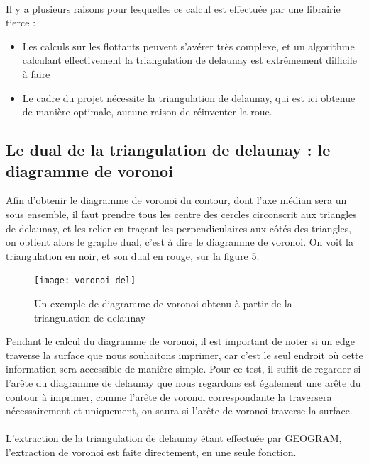 \documentclass[11pt]{article}
\begin{document}
\paragraph*{}
Il y a plusieurs raisons pour lesquelles ce calcul est effectuée par une librairie tierce :
\begin{itemize}
\item Les calculs sur les flottants peuvent s'avérer très complexe, et un algorithme calculant effectivement la triangulation de delaunay est extrêmement difficile à faire
\item Le cadre du projet nécessite la triangulation de delaunay, qui est ici obtenue de manière optimale, aucune raison de réinventer la roue.
\end{itemize}



\subsection{Le dual de la triangulation de delaunay : le diagramme de voronoi}

Afin d'obtenir le diagramme de voronoi du contour, dont l'axe médian sera un sous ensemble, il faut prendre tous les centre des cercles circonscrit aux triangles de delaunay, et les relier en traçant les perpendiculaires aux côtés des triangles, on obtient alors le graphe dual, c'est à dire le diagramme de voronoi. On voit la triangulation en noir, et son dual en rouge, sur la figure 5.

 \begin{figure}[h]
\centering
\texttt{[image: voronoi-del]}
\caption{Un exemple de diagramme de voronoi obtenu à partir de la triangulation de delaunay}
\end{figure}

Pendant le calcul du diagramme de voronoi, il est important de noter si un edge traverse la surface que nous souhaitons imprimer, car c'est le seul endroit où cette information sera accessible de manière simple. Pour ce test, il suffit de regarder si l'arête du diagramme de delaunay que nous regardons est également une arête du contour à imprimer, comme l'arête de voronoi correspondante la traversera nécessairement et uniquement, on saura si l'arête de voronoi traverse la surface. 

\paragraph*{}
L'extraction de la triangulation de delaunay étant effectuée par GEOGRAM, l'extraction de voronoi est faite directement, en une seule fonction.
\end{document}
